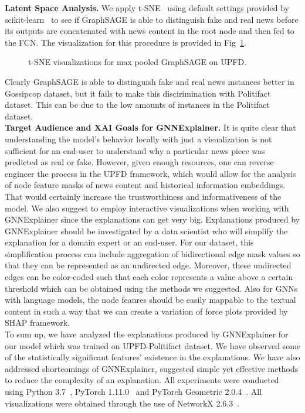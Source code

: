 \textbf{Latent Space Analysis.} We apply t-SNE~\parencite{tSNE_vanDerMaaten} using default settings provided by scikit-learn~\parencite{ScikitLearn_Pedregosa} to see if GraphSAGE is able to distinguish fake and real news before its outputs are concatenated with news content in the root node and then fed to the FCN. The visualization for this procedure is provided in Fig~\ref{fig:TSNE_GraphSAGE}.
\begin{figure}
    \centering
    \hfill
    \caption[t-SNE visualizations for GraphSAGE]{t-SNE visualizations for max pooled GraphSAGE on UPFD.}
    \label{fig:TSNE_GraphSAGE}
\end{figure}
Clearly GraphSAGE is able to distinguish fake and real news instances better in Gossipcop dataset, but it fails to make this discirimination with Politifact dataset. This can be due to the low amounts of instances in the Politifact dataset.\\
\textbf{Target Audience and XAI Goals for GNNExplainer.} It is quite clear that understanding the model's behavior locally with just a visualization is not sufficient for an end-user to understand why a particular news piece was predicted as real or fake. However, given enough resources, one can reverse engineer the process in the UPFD framework, which would allow for the analysis of node feature masks of news content and historical information embeddings. That would certainly increase the trustworthiness and informativeness of the model. We also suggest to employ interactive visualizations when working with GNNExplainer since the explanations can get very big. Explanations produced by GNNExplainer should be investigated by a data scientist who will simplify the explanation for a domain expert or an end-user. For our dataset, this simplification process can include aggregation of bidirectional edge mask values so that they can be represented as an undirected edge. Moreover, these undirected edges can be color-coded such that each color represents a value above a certain threshold which can be obtained using the methods we suggested. Also for GNNs with language models, the node feaures should be easily mappable to the textual content in such a way that we can create a variation of force plots provided by SHAP framework.\\
To sum up, we have analyzed the explanations produced by GNNExplainer for our model which was trained on UPFD-Politifact dataset. We have observed some of the statistically significant features' existence in the explanations. We have also addressed shortcomings of GNNExplainer, suggested simple yet effective methods to reduce the complexity of an explanation. All experiments were conducted using Python 3.7~\parencite{Python_Rossum}, PyTorch 1.11.0~\parencite{PyTorch_Paszke} and PyTorch Geometric 2.0.4~\parencite{PyTorchGeometric_Fey}. All visualizations were obtained through the use of NetworkX 2.6.3~\parencite{NetworkX_Hagberg}.